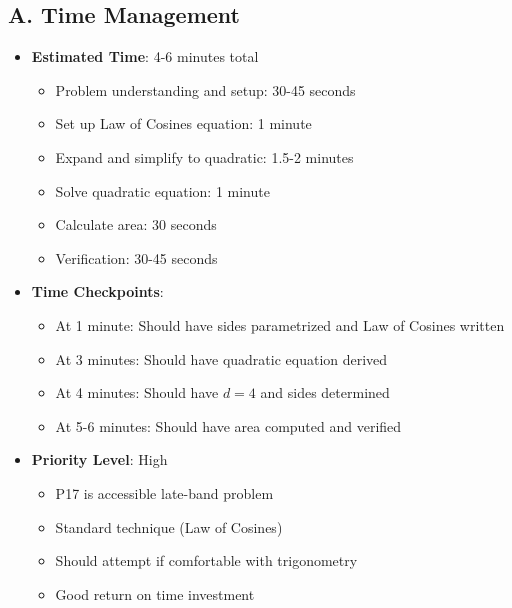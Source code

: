 \documentclass[12pt]{article}
\begin{document}
\begin{competitionbox}
\subsection*{A. Time Management}
\begin{itemize}[leftmargin=*]
    \item \textbf{Estimated Time}: 4-6 minutes total
    \begin{itemize}
        \item Problem understanding and setup: 30-45 seconds
        \item Set up Law of Cosines equation: 1 minute
        \item Expand and simplify to quadratic: 1.5-2 minutes
        \item Solve quadratic equation: 1 minute
        \item Calculate area: 30 seconds
        \item Verification: 30-45 seconds
    \end{itemize}
    \item \textbf{Time Checkpoints}: 
    \begin{itemize}
        \item At 1 minute: Should have sides parametrized and Law of Cosines written
        \item At 3 minutes: Should have quadratic equation derived
        \item At 4 minutes: Should have $d = 4$ and sides determined
        \item At 5-6 minutes: Should have area computed and verified
    \end{itemize}
    \item \textbf{Priority Level}: High
    \begin{itemize}
        \item P17 is accessible late-band problem
        \item Standard technique (Law of Cosines)
        \item Should attempt if comfortable with trigonometry
        \item Good return on time investment
    \end{itemize}
\end{itemize}


\end{competitionbox}
\end{document}
